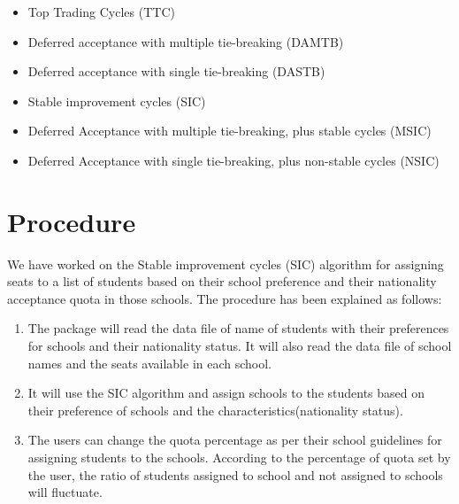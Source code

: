 \documentclass[twocolumn]{bmcart}
\begin{document}
	\begin{sloppypar}
		\begin{itemize}
			\vspace{-0.4cm}\item Top Trading Cycles (TTC) \vspace{\baselineskip}
			\vspace{-0.4cm}\item Deferred acceptance with multiple tie-breaking (DAMTB) \vspace{\baselineskip}
			\vspace{-0.4cm}\item Deferred acceptance with single tie-breaking (DASTB) \vspace{\baselineskip}
			\vspace{-0.4cm}\item Stable improvement cycles (SIC) \vspace{\baselineskip}
			\vspace{-0.4cm}\item Deferred Acceptance with multiple tie-breaking, plus stable cycles (MSIC) \vspace{\baselineskip}
			\vspace{-0.4cm}\item Deferred Acceptance with single tie-breaking, plus non-stable cycles (NSIC)
		\end{itemize}
	\end{sloppypar}
	\section*{Procedure}
	\vspace{\baselineskip}
	We have worked on the Stable improvement cycles (SIC) algorithm for assigning seats to a list of students based on their school preference and their nationality acceptance quota in those schools. The procedure has been explained as follows: \vspace{\baselineskip}
	\vspace{\baselineskip}
	\begin{enumerate}
		\vspace{-0.4cm}\item The package will read the data file of name of students with their preferences for schools and their nationality status. It will also read the data file of school names and the seats available in each school. \vspace{\baselineskip}
		\vspace{-0.4cm}\item It will use the SIC algorithm and assign schools to the students based on their preference of schools and the characteristics(nationality status). \vspace{\baselineskip}
		\vspace{-0.4cm}\item The users can change the quota percentage as per their school guidelines for assigning students to the schools. According to the percentage of quota set by the user, the ratio of students assigned to school and not assigned to schools will fluctuate. \vspace{\baselineskip}
	\end{enumerate}
	
\end{document}
